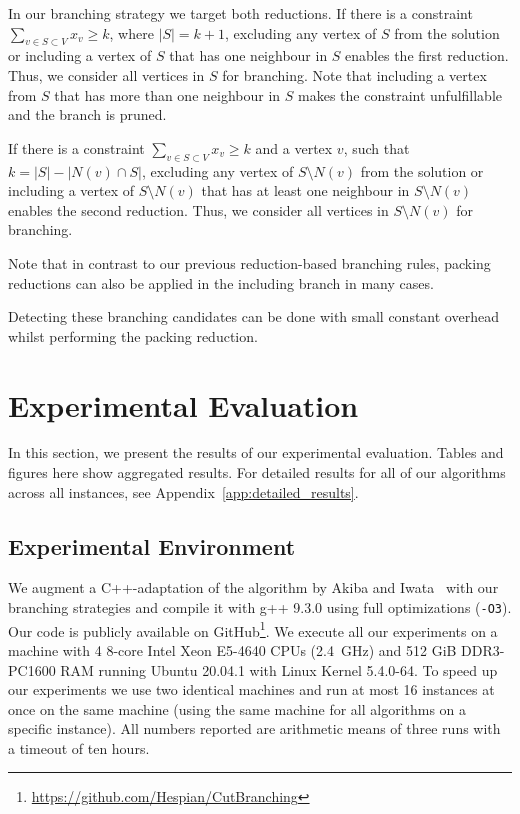 \documentclass[a4paper,UKenglish,cleveref, autoref, thm-restate]{lipics-v2021}
\begin{document}
In our branching strategy we target both reductions. If there is a constraint $\sum_{v\in S\subset V}x_v\geq k$, where $|S| = k + 1$, excluding any vertex of $S$ from the solution or including a vertex of $S$ that has one neighbour in $S$ enables the first reduction. Thus, we consider all vertices in $S$ for branching. Note that including a vertex from $S$ that has more than one neighbour in $S$ makes the constraint unfulfillable and the branch is pruned.

If there is a constraint $\sum_{v\in S\subset V}x_v\geq k$ and a vertex $v$, such that $k = |S|-|N(v)\cap S|$, excluding any vertex of $S\setminus N(v)$ from the solution or including a vertex of $S\setminus N(v)$ that has at least one neighbour in $S\setminus N(v)$ enables the second reduction. Thus, we consider all vertices in $S\setminus N(v)$ for branching.

Note that in contrast to our previous reduction-based branching rules, packing
reductions can also be applied in the including branch in many cases.

Detecting these branching candidates can be done with small constant overhead whilst performing the packing reduction.


\section{Experimental Evaluation}

In this section, we present the results of our experimental evaluation. Tables
and figures here show aggregated results. For
detailed results for all of our algorithms across all instances, see Appendix~\ref{app:detailed_results}.

\subsection{Experimental Environment}
We augment a C++-adaptation of the algorithm by Akiba and
Iwata~\cite{AkibaIwata} with our branching strategies and compile it
with g++ 9.3.0 using full optimizations (\texttt{-O3}). Our
code is publicly available on GitHub\footnote{\url{https://github.com/Hespian/CutBranching}}. We execute all our experiments on a machine with 4 8-core Intel Xeon E5-4640 CPUs
(2.4~GHz) and 512 GiB DDR3-PC1600 RAM running Ubuntu 20.04.1 with Linux Kernel 5.4.0-64. To speed up our experiments we use two
identical machines and run at most 16 instances at once on the
same machine (using the same machine for all algorithms on a specific instance).
All numbers reported are arithmetic means of three runs with a timeout of ten
hours.
\end{document}
